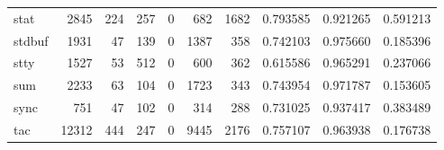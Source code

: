 \begin{longtable}{lrrrrrrrrr}
stat      &                                               2845 &                                                224 &                                                257 &                                                  0 &                                                682 &                                               1682 &                                           0.793585 &                               0.921265 &                             0.591213 \\
stdbuf    &                                               1931 &                                                 47 &                                                139 &                                                  0 &                                               1387 &                                                358 &                                           0.742103 &                               0.975660 &                             0.185396 \\
stty      &                                               1527 &                                                 53 &                                                512 &                                                  0 &                                                600 &                                                362 &                                           0.615586 &                               0.965291 &                             0.237066 \\
sum       &                                               2233 &                                                 63 &                                                104 &                                                  0 &                                               1723 &                                                343 &                                           0.743954 &                               0.971787 &                             0.153605 \\
sync      &                                                751 &                                                 47 &                                                102 &                                                  0 &                                                314 &                                                288 &                                           0.731025 &                               0.937417 &                             0.383489 \\
tac       &                                              12312 &                                                444 &                                                247 &                                                  0 &                                               9445 &                                               2176 &                                           0.757107 &                               0.963938 &                             0.176738 \\

\end{longtable}
